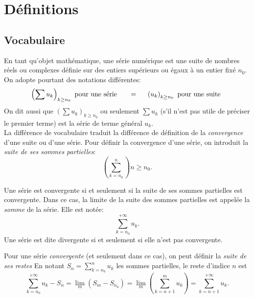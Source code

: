 

\section{Définitions}
\subsection{Vocabulaire}
En tant qu'objet mathématique, une série numérique est une suite de nombres réels ou complexes définie sur des entiers supérieurs ou égaux à un entier fixé $n_0$. On adopte pourtant des notations différentes:
\begin{displaymath}
  \left( \sum u_k \right)_{k\geq n_0} \text{ pour une série } \hspace{0.5cm} = \hspace{0.5cm} 
  \left( u_k \right)_{k\geq n_0} \text{ pour une suite }
\end{displaymath}
On dit aussi que $\left( \sum u_k \right)_{k\geq n_0}$ ou seulement $\sum u_k$ (s'il n'est pas utile de préciser le premier terme) est la série de terme général $u_k$.\\
La différence de vocabulaire traduit la différence de définition de la \emph{convergence} d'une suite ou d'une série. Pour définir la convergence d'une série, on introduit la \emph{suite de ses sommes partielles}: 
\begin{displaymath}
  \left( \sum_{k=n_0}^{n}\right)n\geq n_0 .
\end{displaymath}
\begin{defi}
  Une série est convergente si et seulement si la suite de ses sommes partielles est convergente. Dans ce cas, la limite de la suite des sommes partielles est appelée la \emph{somme} de la série. Elle est notée:
  \begin{displaymath}
    \sum_{k=n_0}^{+\infty} u_k .
  \end{displaymath}
  Une série est dite divergente si et seulement si elle n'est pas convergente.
\end{defi}
  
Pour une série \emph{convergente} (et seulement dans ce cas), on peut définir la \emph{suite de ses restes}\newline
En notant $S_n = \sum_{k=n_0}^{n} u_k$ les sommes partielles, le reste d'indice $n$ est
\begin{displaymath}
  \sum_{k=n_0}^{+\infty} u_k - S_n = \underset{m}{\lim}\left( S_m - S_{n_0}\right)
= \underset{m}{\lim}\left( \sum_{k=n+1}^m u_k\right) =  \sum_{k=n+1}^{+\infty} u_k .
\end{displaymath}

